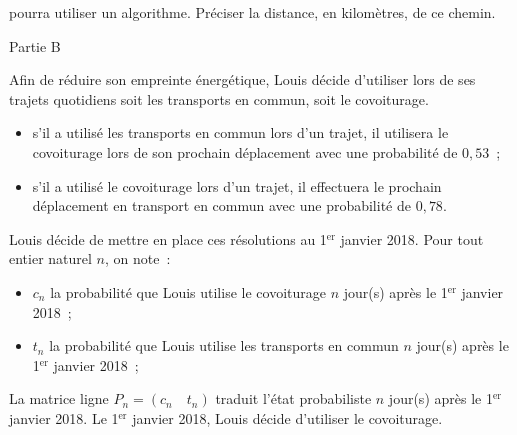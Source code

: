 pourra utiliser un algorithme. Préciser la distance, en kilomètres, de ce chemin.
\begin{center}\begin{h3}Partie B \end{h3}\end{center}
Afin de réduire son empreinte énergétique, Louis décide d'utiliser lors de ses trajets quotidiens
soit les transports en commun, soit le covoiturage.
\begin{itemize}
     \item s'il a utilisé les transports en commun lors d'un trajet, il utilisera le covoiturage lors de son
     prochain déplacement avec une probabilité de $0,53$~;
     \item s'il a utilisé le covoiturage lors d'un trajet, il effectuera le prochain déplacement en transport en commun avec une probabilité de $0,78$.
\end{itemize}
\medskip
Louis décide de mettre en place ces résolutions au 1$^{\text{er}}$ janvier 2018.
\smallskip
Pour tout entier naturel $n$, on note~:
\begin{itemize}
     \item $c_n$ la probabilité que Louis utilise le covoiturage $n$ jour(s) après le 1$^{\text{er}}$ janvier 2018~;
     \item $t_n$ la probabilité que Louis utilise les transports en commun $n$ jour(s) après le 1$^{\text{er}}$ janvier 2018~;
\end{itemize}
\medskip
La matrice ligne $P_n = \left(c_n \quad t_n\right)$ traduit l'état probabiliste $n$ jour(s) après le 1$^{\text{er}}$  janvier 2018.
\smallskip
Le 1$^{\text{er}}$ janvier 2018, Louis décide d'utiliser le covoiturage.
\medskip
